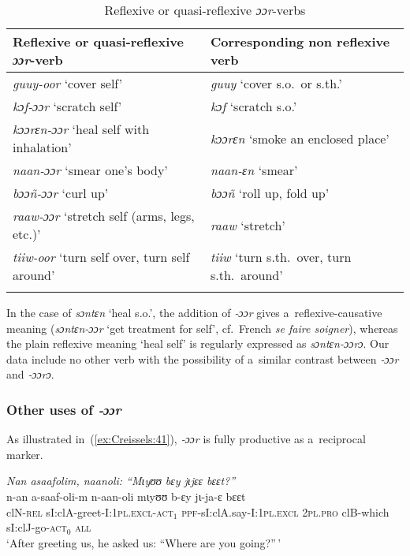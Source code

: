 \documentclass[output=paper]{langscibook}
\begin{document}
\begin{table}[ht]
  \centering
  \begin{tabular}{ll}
    \lsptoprule
    Reflexive or quasi-reflexive \textit{ɔɔr}-verb & Corresponding non reflexive verb \\
    \hline
    \textit{guuy-oor} `cover self' & \textit{guuy} `cover s.o.\ or s.th.' \\
    \textit{kɔf-ɔɔr} `scratch self' & \textit{kɔf} `scratch s.o.' \\
    \textit{kɔɔrɛn-ɔɔr} `heal self with inhalation' & \textit{kɔɔrɛn} `smoke an enclosed place' \\
    \textit{naan-ɔɔr} `smear one's body' & \textit{naan-ɛn} `smear' \\
    \textit{bɔɔñ-ɔɔr} `curl up' & \textit{bɔɔñ} `roll up, fold up' \\
    \textit{raaw-ɔɔr} `stretch self (arms, legs, etc.)' & \textit{raaw} `stretch' \\
    \textit{tiiw-oor} `turn self over, turn self around' & \textit{tiiw} `turn s.th.\ over, turn s.th.\ around' \\
    \lspbottomrule
  \end{tabular}
  \caption{Reflexive or quasi-reflexive \textit{ɔɔr}-verbs}%
  \label{tab:Creissels:refl-oor}
\end{table}

In the case of \textit{sɔntɛn} `heal s.o.', the addition of \textit{‑ɔɔr} gives
a~reflexive-causative meaning (\textit{sɔntɛn-ɔɔr} `get treatment for self', cf.\
French \textit{se faire soigner}), whereas the plain reflexive meaning `heal
self' is regularly expressed as \textit{sɔntɛn-ɔɔrɔ}.  Our data include no other
verb with the possibility of a~similar contrast between \textit{‑ɔɔr} and
\textit{‑ɔɔrɔ}.

\subsubsection{Other uses of \textit{‑ɔɔr}}%
\label{sec:Creissels:other-oor}

As illustrated in~(\ref{ex:Creissels:41}), \textit{‑ɔɔr} is fully productive as
a~reciprocal marker.

\ea
  \label{ex:Creissels:41}
  
    \ea\label{ex:Creissels:41a}
      \textit{Nan asaafolim, naanoli: ``Mɩyʊʊ bɛy jɩjɛɛ bɛɛt?''}\\
      \gll n-an a-saaf-oli-m n-aan-oli mɩyʊʊ b-ɛy jɩ-ja-ɛ bɛɛt\\
      clN-\textsc{rel} sI:clA-greet-I:\textsc{1pl.excl-act$_1$}
      \textsc{ppf}-sI:clA.say-I:\textsc{1pl.excl} \textsc{2pl.pro}
      clB-which sI:clJ-go-\textsc{act$_0$} \textsc{all}\\
      \glt `After greeting us, he asked us: ``Where are you going?''\,'
\end{document}
